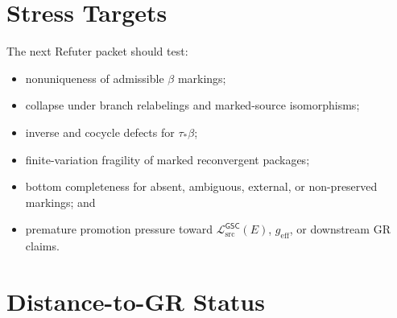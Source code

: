 \documentclass[11pt]{article}
\newcommand{\MetricData}{\mathcal{L}_{\mathrm{src}}^{\mathsf{GSC}}}
\newcommand{\geff}{g_{\mathrm{eff}}}
\begin{document}
\section{Stress Targets}

The next Refuter packet should test:
\begin{itemize}[leftmargin=*]
  \item nonuniqueness of admissible \(\beta\) markings;
  \item collapse under branch relabelings and marked-source isomorphisms;
  \item inverse and cocycle defects for \(\tau_\ast\beta\);
  \item finite-variation fragility of marked reconvergent packages;
  \item bottom completeness for absent, ambiguous, external, or non-preserved
  markings; and
  \item premature promotion pressure toward \(\MetricData(E)\), \(\geff\), or
  downstream GR claims.
\end{itemize}

\section{Distance-to-GR Status}
\end{document}
